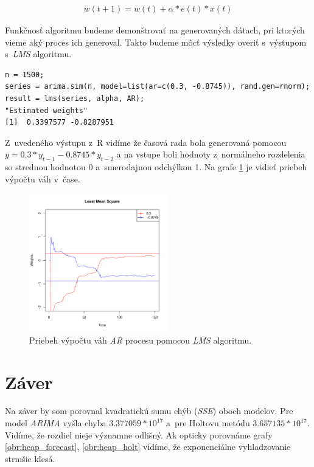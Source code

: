 \documentclass[12pt,a4paper,oneside,final]{article}
\theoremstyle{definition}
\theoremstyle{remark}
\numberwithin{equation}{section}
\begin{document}
\begin{eqnarray} \label{lms}
    w(t+1) = w(t) + \alpha * e(t) * x(t)
\end{eqnarray}

Funkčnosť algoritmu budeme demonštrovať na generovaných dátach, pri ktorých vieme 
aký proces ich generoval. Takto budeme môcť výsledky overiť s~výstupom s~\emph{LMS} algoritmu.

\begin{minipage}{\linewidth}
\begingroup
\fontsize{9pt}{7pt}\selectfont
\begin{verbatim}
n = 1500;
series = arima.sim(n, model=list(ar=c(0.3, -0.8745)), rand.gen=rnorm);
result = lms(series, alpha, AR);
"Estimated weights"
[1]  0.3397577 -0.8287951
\end{verbatim}
\endgroup
\end{minipage}

Z~uvedeného výstupu z~R vidíme že časová rada bola generovaná pomocou \\
\mbox{$y = 0.3*y_{t-1} - 0.8745*y_{t-2}$} a na vstupe boli hodnoty z~normálneho rozdelenia so
strednou hodnotou 0 a~smerodajnou odchýlkou 1. Na grafe \ref{obr:lms} je vidieť priebeh
výpočtu váh v~čase.

\begin{figure}[H]
    \begin{center}
        \includegraphics[width=.8\textwidth,height=6cm]{images/lms.pdf}
        \caption{Priebeh výpočtu váh \emph{AR} procesu pomocou \emph{LMS} algoritmu.}
        \label{obr:lms}
    \end{center}
\end{figure}

\section{Záver}
Na záver by som porovnal kvadratickú sumu chýb (\emph{SSE}) oboch modelov. Pre
model \emph{ARIMA} vyšla chyba $3.377059*10^{17}$ a~pre Holtovu metódu $3.657135*10^{17}$. 
Vidíme, že rozdiel nieje významne odlišný. Ak opticky porovnáme grafy \ref{obr:heap_forecast},
\ref{obr:heap_holt} vidíme, že exponenciálne vyhladzovanie strmšie klesá.
\end{document}
